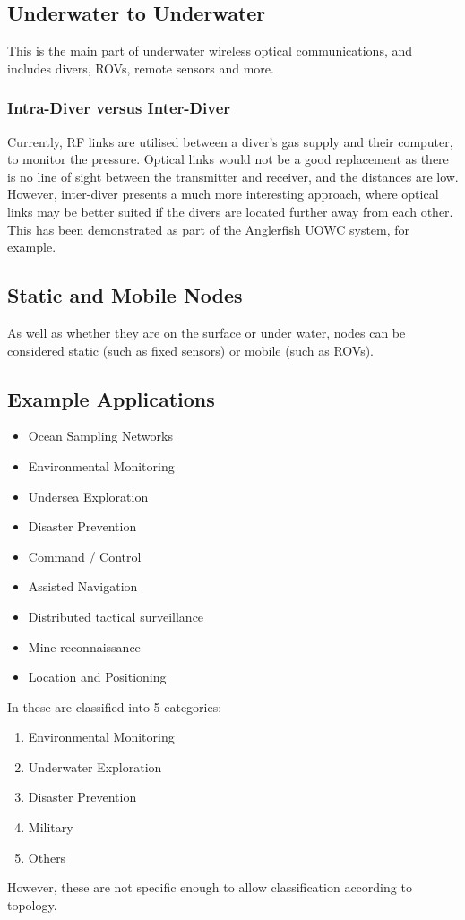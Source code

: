 \subsection{Underwater to Underwater}
This is the main part of underwater wireless optical communications, and
includes divers, \ac{ROV}s, remote sensors and more.

\subsubsection{Intra-Diver versus Inter-Diver}
Currently, \ac{RF} links are utilised between a diver's gas supply and
their computer, to monitor the pressure. Optical links would not be
a good replacement as there is no line of sight between the transmitter
and receiver, and the distances are low. However, inter-diver presents
a much more interesting approach, where optical links may be better suited
if the divers are located further away from each other. This has been
demonstrated as part of the Anglerfish \ac{UOWC} system, for example.

\subsection{Static and Mobile Nodes}
As well as whether they are on the surface or under water, nodes can be
considered static (such as fixed sensors) or mobile (such as \ac{ROV}s).

\subsection{Example Applications}
\begin{itemize}
\item{Ocean Sampling Networks}
\item{Environmental Monitoring}
\item{Undersea Exploration}
\item{Disaster Prevention}
\item{Command / Control}
\item{Assisted Navigation}
\item{Distributed tactical surveillance}
\item{Mine reconnaissance}
\item{Location and Positioning}
\end{itemize}

In \cite{iout_comprehensive} these are classified into 5 categories:
\begin{enumerate}
\item{Environmental Monitoring}
\item{Underwater Exploration}
\item{Disaster Prevention}
\item{Military}
\item{Others}
\end{enumerate}

However, these are not specific enough to allow classification according
to topology.